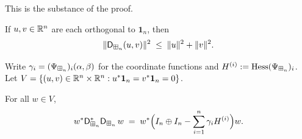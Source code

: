 This is the substance of the proof.

\begin{qfourproposition}\label{prop:contraction}
If $u,v\in\mathbb{R}^n$ are each orthogonal to $\mathbf 1_n$, then
\[
\|\mathsf{D}_{\boxplus_n}(u,v)\|^2\;\le\;\|u\|^2+\|v\|^2.
\]
\end{qfourproposition}

Write $\gamma_i=(\Psi_{\boxplus_n})_i(\alpha,\beta)$ for the coordinate functions and
$H^{(i)}:=\operatorname{Hess}(\Psi_{\boxplus_n})_i$. Let
$V=\{(u,v)\in\mathbb{R}^n\times\mathbb{R}^n:u^\ast\mathbf 1_n=v^\ast\mathbf 1_n=0\}$.

\begin{qfourlemma}\label{lem:hess}
For all $w\in V$,
\[
w^\ast \mathsf{D}_{\boxplus_n}^\ast\mathsf{D}_{\boxplus_n}\, w
\;=\;w^\ast\Bigl(I_n\oplus I_n-\sum_{i=1}^n\gamma_i H^{(i)}\Bigr)w.
\]
\end{qfourlemma}

